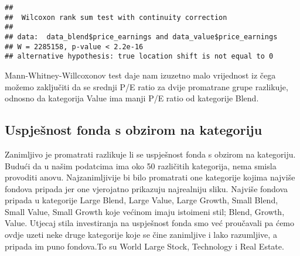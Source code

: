 \documentclass[
]{article}
\newenvironment{Shaded}{\begin{snugshade}}{\end{snugshade}}
\newcommand{\KeywordTok}[1]{\textcolor[rgb]{0.13,0.29,0.53}{\textbf{#1}}}
\newcommand{\NormalTok}[1]{#1}
\newcommand{\OperatorTok}[1]{\textcolor[rgb]{0.81,0.36,0.00}{\textbf{#1}}}
\newcommand{\StringTok}[1]{\textcolor[rgb]{0.31,0.60,0.02}{#1}}
\begin{document}
\begin{Shaded}
\end{Shaded}

\begin{verbatim}
## 
##  Wilcoxon rank sum test with continuity correction
## 
## data:  data_blend$price_earnings and data_value$price_earnings
## W = 2285158, p-value < 2.2e-16
## alternative hypothesis: true location shift is not equal to 0
\end{verbatim}

Mann-Whitney-Willcoxonov test daje nam izuzetno malo vrijednost iz čega
možemo zaključiti da se srednji P/E ratio za dvije promatrane grupe
razlikuje, odnosno da kategorija Value ima manji P/E ratio od kategorije
Blend.

\hypertarget{uspjeux161nost-fonda-s-obzirom-na-kategoriju}{%
\subsection{Uspješnost fonda s obzirom na
kategoriju}\label{uspjeux161nost-fonda-s-obzirom-na-kategoriju}}

Zanimljivo je promatrati razlikuje li se uspješnost fonda s obzirom na
kategoriju. Budući da u našim podatcima ima oko 50 različitih
kategorija, nema smisla provoditi anovu. Najzanimljivije bi bilo
promatrati one kategorije kojima najviše fondova pripada jer one
vjerojatno prikazuju najrealniju sliku. Najviše fondova pripada u
kategorije Large Blend, Large Value, Large Growth, Small Blend, Small
Value, Small Growth koje većinom imaju istoimeni stil; Blend, Growth,
Value. Utjecaj stila investiranja na uspješnost fonda smo već proučavali
pa ćemo ovdje uzeti neke druge kategorije koje se čine zanimljive i lako
razumljive, a pripada im puno fondova.To su World Large Stock,
Technology i Real Estate.
\end{document}
